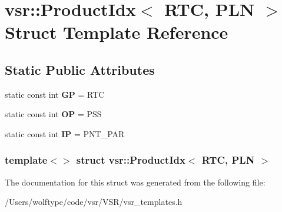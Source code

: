 \hypertarget{structvsr_1_1_product_idx_3_01_r_t_c_00_01_p_l_n_01_4}{\section{vsr\-:\-:Product\-Idx$<$ R\-T\-C, P\-L\-N $>$ Struct Template Reference}
\label{structvsr_1_1_product_idx_3_01_r_t_c_00_01_p_l_n_01_4}
}
\subsection*{Static Public Attributes}
\begin{DoxyCompactItemize}
\item 
\hypertarget{structvsr_1_1_product_idx_3_01_r_t_c_00_01_p_l_n_01_4_a690530a78f468e682977b7ab8fb7ce19}{static const int {\bfseries G\-P} = R\-T\-C}\label{structvsr_1_1_product_idx_3_01_r_t_c_00_01_p_l_n_01_4_a690530a78f468e682977b7ab8fb7ce19}

\item 
\hypertarget{structvsr_1_1_product_idx_3_01_r_t_c_00_01_p_l_n_01_4_ac12361467af1c0c036797092ee2aeb14}{static const int {\bfseries O\-P} = P\-S\-S}\label{structvsr_1_1_product_idx_3_01_r_t_c_00_01_p_l_n_01_4_ac12361467af1c0c036797092ee2aeb14}

\item 
\hypertarget{structvsr_1_1_product_idx_3_01_r_t_c_00_01_p_l_n_01_4_a10347d505bd81557ab6da7eb44a6f3e5}{static const int {\bfseries I\-P} = P\-N\-T\-\_\-\-P\-A\-R}\label{structvsr_1_1_product_idx_3_01_r_t_c_00_01_p_l_n_01_4_a10347d505bd81557ab6da7eb44a6f3e5}

\end{DoxyCompactItemize}
\subsubsection*{template$<$$>$ struct vsr\-::\-Product\-Idx$<$ R\-T\-C, P\-L\-N $>$}



The documentation for this struct was generated from the following file\-:\begin{DoxyCompactItemize}
\item 
/\-Users/wolftype/code/vsr/\-V\-S\-R/vsr\-\_\-templates.\-h\end{DoxyCompactItemize}
